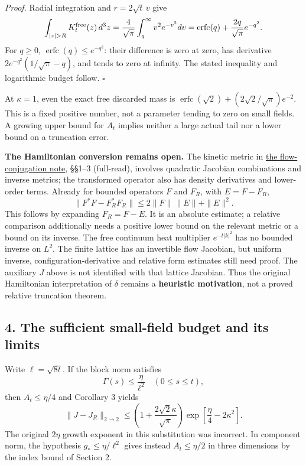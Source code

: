 \documentclass[11pt,a4paper]{article}
\begin{document}
\emph{Proof.} Radial integration and \(r=2\sqrt t\,v\) give
\[\int_{|z|>R}K_t^{\rm free}(z)\,d^3z
=\frac4{\sqrt\pi}\int_q^\infty v^2e^{-v^2}dv
=\operatorname{erfc}(q)+\frac{2q}{\sqrt\pi}e^{-q^2}.\] For \(q\ge0\),
\(\operatorname{erfc}(q)\le e^{-q^2}\): their difference is zero at
zero, has derivative \(2e^{-q^2}(1/\sqrt\pi-q)\), and tends to zero at
infinity. The stated inequality and logarithmic budget follow.
\(\square\)

At \(\kappa=1\), even the exact free discarded mass is
\(\operatorname{erfc}(\sqrt2)+(2\sqrt2/\sqrt\pi)e^{-2}\). This is a
fixed positive number, not a parameter tending to zero on small fields.
A growing upper bound for \(A_t\) implies neither a large actual tail
nor a lower bound on a truncation error.

\textbf{The Hamiltonian conversion remains open.} The kinetic metric in
\href{flow-conjugation-truncation.md}{the flow-conjugation note}, §§1--3
(full-read), involves quadratic Jacobian combinations and inverse
metrics; the transformed operator also has density derivatives and
lower-order terms. Already for bounded operators \(F\) and \(F_R\), with
\(E=F-F_R\), \[\|F^*F-F_R^*F_R\|
\le2\|F\|\,\|E\|+\|E\|^2.\] This follows by expanding \(F_R=F-E\). It is
an absolute estimate; a relative comparison additionally needs a
positive lower bound on the relevant metric or a bound on its inverse.
The free continuum heat multiplier \(e^{-t|k|^2}\) has no bounded
inverse on \(L^2\). The finite lattice has an invertible flow Jacobian,
but uniform inverse, configuration-derivative and relative form
estimates still need proof. The auxiliary \(J\) above is not identified
with that lattice Jacobian. Thus the original Hamiltonian interpretation
of \(\delta\) remains a \textbf{heuristic motivation}, not a proved
relative truncation theorem.

\hypertarget{the-sufficient-small-field-budget-and-its-limits}{%
\subsection{4. The sufficient small-field budget and its
limits}\label{the-sufficient-small-field-budget-and-its-limits}}

Write \(\ell=\sqrt{8t}\). If the block norm satisfies
\[\Gamma(s)\le\frac\eta{\ell^2}\quad(0\le s\le t),\] then
\(A_t\le\eta/4\) and Corollary 3 yields \[\|J-J_R\|_{2\to2}
\le\left(1+\frac{2\sqrt2\kappa}{\sqrt\pi}\right)
\exp\left[\frac\eta4-2\kappa^2\right].\] The original \(2\eta\) growth
exponent in this substitution was incorrect. In component norm, the
hypothesis \(g_*\le\eta/\ell^2\) gives instead \(A_t\le\eta/2\) in three
dimensions by the index bound of Section 2.
\end{document}
